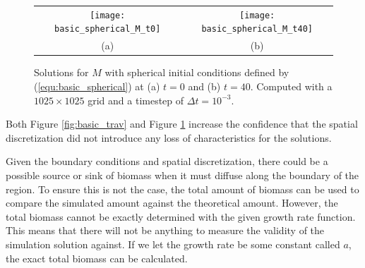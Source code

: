   \begin{figure}
    \centering
    \begin{tabular}{c c}
      \texttt{[image: basic\_spherical\_M\_t0]} & 
      \texttt{[image: basic\_spherical\_M\_t40]} \\
      (a) & (b)
    \end{tabular}
    \caption{Solutions for $M$ with spherical initial conditions defined by (\ref{equ:basic_spherical}) at (a) $t = 0$ and (b) $t = 40$. Computed with a $1025 \times 1025$ grid and a timestep of $\Delta t = 10^{-3}$.}
    \label{fig:basic_spherical}
  \end{figure}
  
  Both Figure \ref{fig:basic_trav} and Figure \ref{fig:basic_spherical} increase the confidence that the spatial discretization did not introduce any loss of characteristics for the solutions.
    


  Given the boundary conditions and spatial discretization, there could be a possible source or sink of biomass when it must diffuse along the boundary of the region.
  To ensure this is not the case, the total amount of biomass can be used to compare the simulated amount against the theoretical amount. 
  However, the total biomass cannot be exactly determined with the given growth rate function.
  This means that there will not be anything to measure the validity of the simulation solution against.
  If we let the growth rate be some constant called $a$, the exact total biomass can be calculated.


